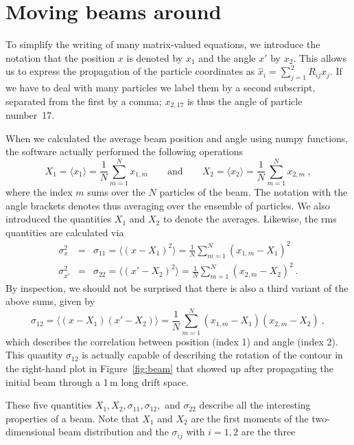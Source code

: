 \documentclass{article}
\begin{document}
\section{Moving beams around}
%
To simplify the writing of many matrix-valued equations, we introduce the notation 
that the position $x$ is denoted by $x_1$ and the angle $x'$ by $x_2.$ This allows us
to express the propagation of the particle coordinates as $\hat x_i=\sum_{j=1}^2 R_{ij}x_j.$
If we have to deal with many particles we label them by a second subscript, separated from 
the first by a comma; $x_{2,17}$ is thus the angle of particle number~17.
\par
When we calculated the average beam position and angle using numpy functions, the software 
actually performed the following operations
\begin{equation}
X_1=\langle x_1\rangle = \frac{1}{N}\sum_{m=1}^N x_{1,m}
\qquad\mathrm{and}\qquad
X_2=\langle x_2\rangle = \frac{1}{N}\sum_{m=1}^N x_{2,m}\ ,
\end{equation}
where the index $m$ sums over the $N$ particles of the beam. The notation with the angle brackets 
denotes thus averaging over the ensemble of particles. We also introduced the quantities
$X_1$ and $X_2$ to denote the averages. Likewise, the rms quantities are calculated via
\begin{eqnarray}
\sigma_x^2&=& \sigma_{11}=\langle(x-X_1)^2\rangle = \frac{1}{N}\sum_{m=1}^N (x_{1,m}-X_1)^2\nonumber\\
\sigma_{x'}^2&=& \sigma_{22}=\langle(x'-X_2)^2\rangle = \frac{1}{N}\sum_{m=1}^N (x_{2,m}-X_2)^2\ .
\end{eqnarray}
By inspection, we should not be surprised that there is also a third variant of the above sums,
given by
\begin{equation}
\sigma_{12}=\langle(x-X_1)(x'-X_2)\rangle = \frac{1}{N}\sum_{m=1}^N (x_{1,m}-X_1)(x_{2,m}-X_2)\ ,
\end{equation}
which describes the correlation between position (index 1) and angle (index 2). This quantity
$\sigma_{12}$ is actually capable of describing the rotation of the contour in the right-hand
plot in Figure~\ref{fig:beam} that showed up after propagating the initial beam through
a 1\,m long drift space.
\par
These five quantities $X_1, X_2, \sigma_{11}, \sigma_{12},$ and $\sigma_{22}$ describe all 
the interesting properties of a beam. Note that $X_1$ and $X_2$ are the first moments of
the two-dimensional beam distribution and the $\sigma_{ij}$ with $i=1,2$ are the three 
\end{document}
